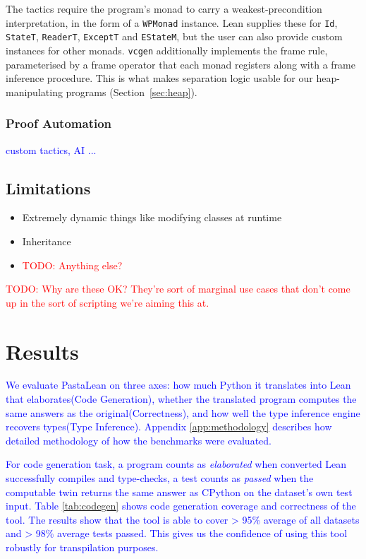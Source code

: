 \documentclass{article}
\newcommand{\code}{\lstinline}
\newcommand{\todo}[1]{\textcolor{red}{TODO: #1}}
\newcommand{\suggest}[1]{\textcolor{blue}{#1}}
\begin{document}
The tactics require the program's monad to carry a weakest-precondition interpretation, in the form of
a \code{WPMonad} instance. Lean supplies these for \code{Id}, \code{StateT}, \code{ReaderT},
\code{ExceptT} and \code{EStateM}, but the user can also provide custom instances for other monads. \code{vcgen} additionally implements the frame rule, parameterised by a frame operator that each monad
registers along with a frame inference procedure. This is what makes separation logic usable for
our heap-manipulating programs (Section~\ref{sec:heap}).

\subsubsection{Proof Automation}\label{sec:proofautomation}

\suggest{custom tactics, AI ...}

\subsection{Limitations}

\begin{itemize}
    \item Extremely dynamic things like modifying classes at runtime
    \item Inheritance
    \item \todo{Anything else?}
\end{itemize}

\todo{Why are these OK? They're sort of marginal use cases that don't come up in the sort of scripting we're aiming this at.}

\section{Results}\label{results}

\suggest{We evaluate PastaLean on three axes: how much Python it translates into Lean that elaborates(Code Generation), whether the translated program computes the same answers as the original(Correctness), and how well the type inference engine recovers types(Type Inference). Appendix \ref{app:methodology} describes how detailed methodology of how the benchmarks were evaluated.}

\suggest{For code generation task, a program counts as \emph{elaborated} when converted Lean successfully compiles and type-checks, a test counts as \emph{passed} when the computable twin returns the same answer as CPython on the dataset's own test input. Table \ref{tab:codegen} shows code generation coverage and correctness of the tool. The results show that the tool is able to cover > 95\% average of all datasets and > 98\% average tests passed. This gives us the confidence of using this tool robustly for transpilation purposes.}
\end{document}
